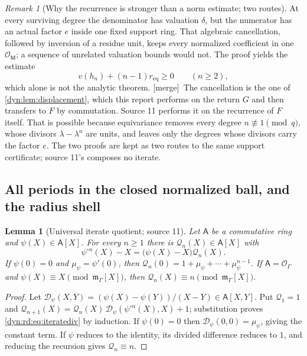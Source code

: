 \documentclass[11pt,letterpaper]{article}
\newtheorem{lemma}[lemma]{Lemma}
\theoremstyle{definition}
\theoremstyle{remark}
\newtheorem{remark}[remark]{Remark}
\newcommand{\OO}{\mathcal O}
\newcommand{\m}{\mathfrak m}
\newcommand{\mergetag}{\textup{\textsf{\small[merge]}}}%
\numberwithin{equation}{section}
\begin{document}
\begin{remark}[Why the recurrence is stronger than a norm estimate; two
routes]\label{dyn:rd:rem:cancel}
At every surviving degree the denominator has valuation $\delta$, but the
numerator has an actual factor $e$ inside one fixed support ring. That
algebraic cancellation, followed by inversion of a residue unit, keeps every
normalized coefficient in one $\OO_{\mathsf M}$; a sequence of unrelated
valuation bounds would not. The proof yields the estimate
\begin{equation}\label{dyn:rd:eq:coeffbound}
 v(h_n)+(n-1)r_{\mathrm{eq}}\ge0\qquad(n\ge2),
\end{equation}
which alone is not the analytic theorem. \mergetag\ The cancellation is the
one of \cref{dyn:lem:displacement}, which this report performs on the
return $G$ and then transfers to $F$ by commutation. Source 11 performs it
on the recurrence of $F$ itself. That is possible because equivariance
removes every degree $n\not\equiv1\pmod q$, whose divisors
$\lambda-\lambda^{n}$ are units, and leaves only the degrees whose divisors
carry the factor $e$. The two proofs are kept as two routes to the same
support certificate; source 11's composes no iterate.
\end{remark}

\subsection{All periods in the closed normalized ball, and the radius shell}
\label{dyn:rd:subsec:shell}

\begin{lemma}[Universal iterate quotient; source 11]\label{dyn:rd:lem:iterate}
Let $\mathsf A$ be a commutative ring and $\psi(X)\in\mathsf A[X]$. For
every $n\ge1$ there is $\mathcal Q_n(X)\in\mathsf A[X]$ with
\begin{equation}\label{dyn:rd:eq:iteratediv}
 \psi^{\circ n}(X)-X=\bigl(\psi(X)-X\bigr)\mathcal Q_n(X).
\end{equation}
If $\psi(0)=0$ and $\mu_\psi=\psi'(0)$, then
$\mathcal Q_n(0)=1+\mu_\psi+\cdots+\mu_\psi^{n-1}$. If $\mathsf A=\OO_\Gamma$
and $\psi(X)\equiv X\pmod{\m_\Gamma[X]}$, then
$\mathcal Q_n(X)\equiv n\pmod{\m_\Gamma[X]}$.
\end{lemma}
\begin{proof}
Let
$\mathcal D_\psi(X,Y)=(\psi(X)-\psi(Y))/(X-Y)\in\mathsf A[X,Y]$. Put
$\mathcal Q_1=1$ and
$\mathcal Q_{n+1}(X)=\mathcal Q_n(X)\,\mathcal D_\psi(\psi^{\circ n}(X),X)+1$;
substitution proves \eqref{dyn:rd:eq:iteratediv} by induction. If
$\psi(0)=0$ then $\mathcal D_\psi(0,0)=\mu_\psi$, giving the constant term.
If $\psi$ reduces to the identity, its divided difference reduces to $1$,
and reducing the recursion gives $\mathcal Q_n\equiv n$.
\end{proof}
\end{document}
